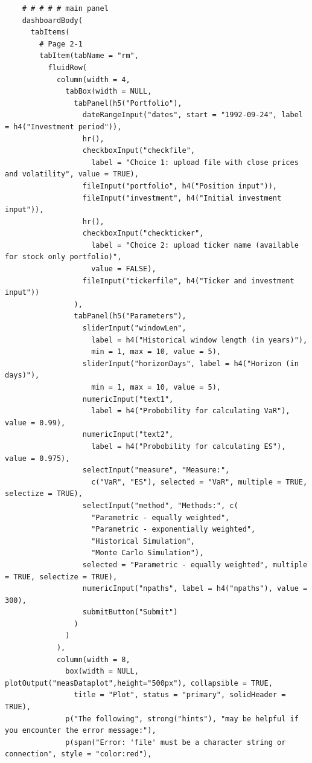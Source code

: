 \documentclass[letterpaper,11pt, oneside]{layout}
\begin{document}
\begin{spacing}{1}
\begin{lstlisting}
    # # # # # main panel
    dashboardBody(
      tabItems(
        # Page 2-1
        tabItem(tabName = "rm",
          fluidRow(
            column(width = 4, 
              tabBox(width = NULL,
                tabPanel(h5("Portfolio"),
                  dateRangeInput("dates", start = "1992-09-24", label = h4("Investment period")),
                  hr(),
                  checkboxInput("checkfile", 
                    label = "Choice 1: upload file with close prices and volatility", value = TRUE),
                  fileInput("portfolio", h4("Position input")),
                  fileInput("investment", h4("Initial investment input")),
                  hr(),
                  checkboxInput("checkticker", 
                    label = "Choice 2: upload ticker name (available for stock only portfolio)", 
                    value = FALSE),
                  fileInput("tickerfile", h4("Ticker and investment input"))
                ),
                tabPanel(h5("Parameters"),
                  sliderInput("windowLen",
                    label = h4("Historical window length (in years)"),
                    min = 1, max = 10, value = 5),
                  sliderInput("horizonDays", label = h4("Horizon (in days)"),
                    min = 1, max = 10, value = 5),
                  numericInput("text1", 
                    label = h4("Probobility for calculating VaR"), value = 0.99),
                  numericInput("text2", 
                    label = h4("Probobility for calculating ES"), value = 0.975),
                  selectInput("measure", "Measure:", 
                    c("VaR", "ES"), selected = "VaR", multiple = TRUE, selectize = TRUE),
                  selectInput("method", "Methods:", c(
                    "Parametric - equally weighted", 
                    "Parametric - exponentially weighted",
                    "Historical Simulation", 
                    "Monte Carlo Simulation"), 
                  selected = "Parametric - equally weighted", multiple = TRUE, selectize = TRUE),
                  numericInput("npaths", label = h4("npaths"), value = 300),
                  submitButton("Submit")
                )
              )
            ),
            column(width = 8,
              box(width = NULL, plotOutput("measDataplot",height="500px"), collapsible = TRUE,
                title = "Plot", status = "primary", solidHeader = TRUE),
              p("The following", strong("hints"), "may be helpful if you encounter the error message:"),
              p(span("Error: 'file' must be a character string or connection", style = "color:red"),

\end{lstlisting}
\end{spacing}
\end{document}
